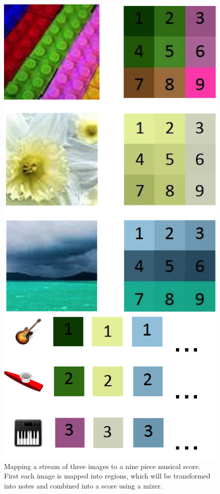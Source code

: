 \documentclass[10pt, conference, compsocconf]{IEEEtran}
\begin{document}
\begin{figure}
  \centering
  \begin{minipage}[t]{.3\textwidth}
    \centering
    \includegraphics[width=.7\textwidth]{images-to-regions.png}
  \end{minipage}
  \begin{minipage}[t]{.1\textwidth}
    \raisebox{.8 in}{\Huge $\to$}
  \end{minipage}
  \begin{minipage}[t]{.4\textwidth}
    \centering
    \includegraphics[width=\textwidth]{parts-and-instruments.png}
  \end{minipage}
  \caption{Mapping a stream of three images to a nine piece musical
    score.  First each image is mapped into regions, which will be
    transformed into notes and combined into a score using a mixer.}
  \label{fig:images-to-music}
\end{figure}
  
\end{document}

